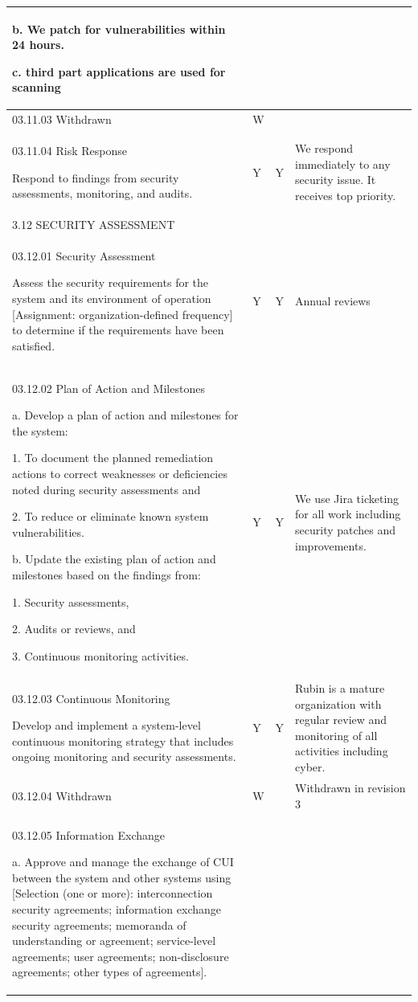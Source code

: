 \begin{longtable} {|p{}|p{}|p{}|p{} |}
{b. We patch for vulnerabilities within 24 hours.

c. third part applications are used for scanning} \\ \hline
{03.11.03 Withdrawn}&{W}&& \\ \hline
{03.11.04 Risk Response

Respond to findings from security assessments, monitoring, and audits.}&{Y}&{Y}&{We respond immediately to any security issue. It receives top priority.} \\ \hline
{3.12 SECURITY ASSESSMENT}&&& \\ \hline
{03.12.01 Security Assessment

Assess the security requirements for the system and its environment of operation [Assignment: organization-defined frequency] to determine if the requirements have been satisfied.}&{Y}&{Y}&{Annual reviews} \\ \hline
{03.12.02 Plan of Action and Milestones

a. Develop a plan of action and milestones for the system:

1. To document the planned remediation actions to correct weaknesses or deficiencies noted during security assessments and

2. To reduce or eliminate known system vulnerabilities.

b. Update the existing plan of action and milestones based on the findings from:

1. Security assessments,

2. Audits or reviews, and

3. Continuous monitoring activities.}&{Y}&{Y}&{We use Jira ticketing for all work including security patches and improvements.} \\ \hline
{03.12.03 Continuous Monitoring

Develop and implement a system-level continuous monitoring strategy that includes ongoing monitoring and security assessments.}&{Y}&{Y}&{Rubin is a mature organization with regular review and monitoring of all activities including cyber.} \\ \hline
{03.12.04 Withdrawn}&{W}&{}&{Withdrawn in revision 3} \\ \hline
{03.12.05 Information Exchange

a. Approve and manage the exchange of CUI between the system and other systems using [Selection (one or more): interconnection security agreements; information exchange security agreements; memoranda of understanding or agreement; service-level agreements; user agreements; non-disclosure agreements; other types of agreements].

}
\end{longtable}

